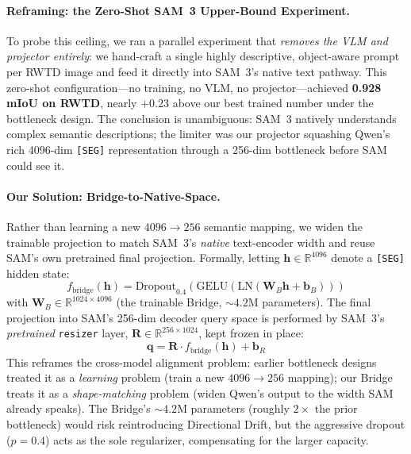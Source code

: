 \documentclass{article}
\begin{document}
\paragraph{Reframing: the Zero-Shot SAM~3 Upper-Bound Experiment.}
To probe this ceiling, we ran a parallel experiment that \emph{removes the VLM and projector entirely}: we hand-craft a single highly descriptive, object-aware prompt per RWTD image and feed it directly into SAM~3's native text pathway. This zero-shot configuration---no training, no VLM, no projector---achieved \textbf{0.928 mIoU on RWTD}, nearly $+0.23$ above our best trained number under the bottleneck design. The conclusion is unambiguous: SAM~3 natively understands complex semantic descriptions; the limiter was our projector squashing Qwen's rich 4096-dim \texttt{[SEG]} representation through a 256-dim bottleneck before SAM could see it.

\paragraph{Our Solution: Bridge-to-Native-Space.}
Rather than learning a new $4096 \to 256$ semantic mapping, we widen the trainable projection to match SAM~3's \emph{native} text-encoder width and reuse SAM's own pretrained final projection. Formally, letting $\mathbf{h} \in \mathbb{R}^{4096}$ denote a \texttt{[SEG]} hidden state:
\begin{equation}
    f_{\text{bridge}}(\mathbf{h}) = \mathrm{Dropout}_{0.4}\!\left(\mathrm{GELU}\!\left(\mathrm{LN}\!\left(\mathbf{W}_B \mathbf{h} + \mathbf{b}_B\right)\right)\right)
\end{equation}
with $\mathbf{W}_B \in \mathbb{R}^{1024 \times 4096}$ (the trainable Bridge, ${\sim}4.2$M parameters). The final projection into SAM's 256-dim decoder query space is performed by SAM~3's \emph{pretrained} \texttt{resizer} layer, $\mathbf{R} \in \mathbb{R}^{256 \times 1024}$, kept frozen in place:
\begin{equation}
    \mathbf{q} = \mathbf{R} \cdot f_{\text{bridge}}(\mathbf{h}) + \mathbf{b}_R
\end{equation}
This reframes the cross-model alignment problem: earlier bottleneck designs treated it as a \emph{learning} problem (train a new $4096 \to 256$ mapping); our Bridge treats it as a \emph{shape-matching} problem (widen Qwen's output to the width SAM already speaks). The Bridge's ${\sim}4.2$M parameters (roughly $2\times$ the prior bottleneck) would risk reintroducing Directional Drift, but the aggressive dropout ($p = 0.4$) acts as the sole regularizer, compensating for the larger capacity.
\end{document}
